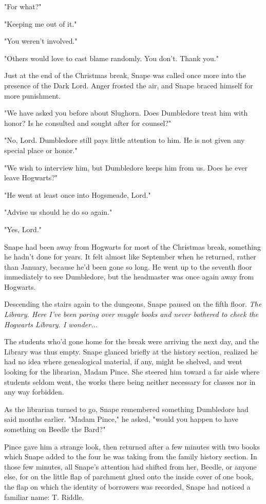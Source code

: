 \documentclass[a4paper,11pt]{article}
\begin{document}
"For what?"

"Keeping me out of it."

"You weren't involved."

"Others would love to cast blame randomly. You don't. Thank you."

Just at the end of the Christmas break, Snape was called once more into the presence of the Dark Lord. Anger frosted the air, and Snape braced himself for more punishment.

"We have asked you before about Slughorn. Does Dumbledore treat him with honor? Is he consulted and sought after for counsel?"

"No, Lord. Dumbledore still pays little attention to him. He is not given any special place or honor."

"We wish to interview him, but Dumbledore keeps him from us. Does he ever leave Hogwarts?"

"He went at least once into Hogsmeade, Lord."

"Advise us should he do so again."

"Yes, Lord."

Snape had been away from Hogwarts for most of the Christmas break, something he hadn't done for years. It felt almost like September when he returned, rather than January, because he'd been gone so long. He went up to the seventh floor immediately to see Dumbledore, but the headmaster was once again away from Hogwarts.

Descending the stairs again to the dungeons, Snape paused on the fifth floor. \emph{The Library. Here I've been poring over muggle books and never bothered to check the Hogwarts Library. I wonder...}

The students who'd gone home for the break were arriving the next day, and the Library was thus empty. Snape glanced briefly at the history section, realized he had no idea where genealogical material, if any, might be shelved, and went looking for the librarian, Madam Pince. She steered him toward a far aisle where students seldom went, the works there being neither necessary for classes nor in any way forbidden.

As the librarian turned to go, Snape remembered something Dumbledore had said months earlier. "Madam Pince," he asked, "would you happen to have something on Beedle the Bard?"

Pince gave him a strange look, then returned after a few minutes with two books which Snape added to the four he was taking from the family history section. In those few minutes, all Snape's attention had shifted from her, Beedle, or anyone else, for on the little flap of parchment glued onto the inside cover of one book, the flap on which the identity of borrowers was recorded, Snape had noticed a familiar name: T. Riddle.
\end{document}
